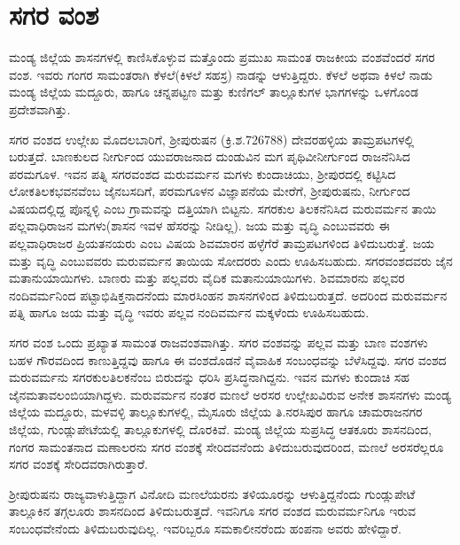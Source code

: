 \section{ಸಗರ ವಂಶ}

ಮಂಡ್ಯ ಜಿಲ್ಲೆಯ ಶಾಸನಗಳಲ್ಲಿ ಕಾಣಿಸಿಕೊಳ್ಳುವ ಮತ್ತೊಂದು ಪ್ರಮುಖ ಸಾಮಂತ ರಾಜಕೀಯ ವಂಶವೆಂದರೆ ಸಗರ ವಂಶ. ಇವರು ಗಂಗರ ಸಾಮಂತರಾಗಿ ಕೆಳಲೆ(ಕಿಳಲೆ ಸಹಸ್ರ) ನಾಡನ್ನು ಆಳುತ್ತಿದ್ದರು. ಕೆಳಲೆ ಅಥವಾ ಕಿಳಲೆ ನಾಡು ಮಂಡ್ಯ ಜಿಲ್ಲೆಯ ಮದ್ದೂರು, ಹಾಗೂ ಚನ್ನಪಟ್ಟಣ ಮತ್ತು ಕುಣಿಗಲ್​ ತಾಲ್ಲೂಕುಗಳ ಭಾಗಗಳನ್ನು ಒಳಗೊಂಡ ಪ್ರದೇಶವಾಗಿತ್ತು.

ಸಗರ ವಂಶದ ಉಲ್ಲೇಖ ಮೊದಲಬಾರಿಗೆ, ಶ‍್ರೀಪುರುಷನ (ಕ್ರಿ.ಶ.726\enginline{-}788) ದೇವರಹಳ್ಳಿಯ ತಾಮ್ರಪಟಗಳಲ್ಲಿ ಬರುತ್ತದೆ. ಬಾಣಕುಲದ ನೀರ್ಗುಂದ ಯುವರಾಜನಾದ ದುಂಡುವಿನ ಮಗ ಪೃಥಿವೀನೀರ್ಗುಂದ ರಾಜನೆನಿಸಿದ ಪರಮಗೂಳ. ಇವನ ಪತ್ನಿ ಸಗರವಂಶದ ಮರುವರ್ಮನ ಮಗಳು ಕುಂದಾಚಿಯು, ಶ‍್ರೀಪುರದಲ್ಲಿ ಕಟ್ಟಿಸಿದ ಲೋಕತಿಲಕಭವನವೆಂಬ ಜೈನಬಸದಿಗೆ, ಪರಮಗೂಳನ ವಿಜ್ಞಾಪನೆಯ ಮೇರೆಗೆ, ಶ‍್ರೀಪುರುಷನು, ನೀರ್ಗುಂದ ವಿಷಯದಲ್ಲಿದ್ದ ಪೊನ್ನಳ್ಳಿ ಎಂಬ ಗ್ರಾಮವನ್ನು ದತ್ತಿಯಾಗಿ ಬಿಟ್ಟನು. ಸಗರಕುಲ ತಿಲಕನೆನಿಸಿದ ಮರುವರ್ಮನ ತಾಯಿ ಪಲ್ಲವಾಧಿರಾಜನ ಮಗಳು(ಶಾಸನ ಇವಳ ಹೆಸರನ್ನು ನೀಡಿಲ್ಲ). ಜಯ ಮತ್ತು ವೃದ್ಧಿ ಎಂಬುವವರು ಈ ಪಲ್ಲವಾಧಿರಾಜರ ಪ್ರಿಯತನಯರು ಎಂಬ ವಿಷಯ ಶಿವಮಾರನ ಹಳ್ಳೆಗೆರೆ ತಾಮ್ರಪಟಗಳಿಂದ ತಿಳಿದುಬರುತ್ತೆ. ಜಯ ಮತ್ತು ವೃದ್ಧಿ ಎಂಬುವವರು ಮರುವರ್ಮನ ತಾಯಿಯ ಸೋದರರು ಎಂದು ಊಹಿಸಬಹುದು. ಸಗರವಂಶದವರು ಜೈನ ಮತಾನುಯಾಯಿಗಳು. ಬಾಣರು ಮತ್ತು ಪಲ್ಲವರು ವೈದಿಕ ಮತಾನುಯಾಯಿಗಳು. ಶಿವಮಾರನು ಪಲ್ಲವರ ನಂದಿವರ್ಮನಿಂದ ಪಟ್ಟಾಭಿಷಿಕ್ತನಾದನೆಂದು ಮಾರಸಿಂಹನ ಶಾಸನಗಳಿಂದ ತಿಳಿದುಬರುತ್ತದೆ. ಅದರಿಂದ ಮರುವರ್ಮನ ಪತ್ನಿ ಹಾಗೂ ಜಯ ಮತ್ತು ವೃದ್ಧಿ ಇವರು ಪಲ್ಲವ ನಂದಿವರ್ಮನ ಮಕ್ಕಳೆಂದು ಊಹಿಸಬಹುದು.

ಸಗರ ವಂಶ ಒಂದು ಪ್ರಖ್ಯಾತ ಸಾಮಂತ ರಾಜವಂಶವಾಗಿತ್ತು. ಸಗರ ವಂಶವನ್ನು ಪಲ್ಲವ ಮತ್ತು ಬಾಣ ವಂಶಗಳು ಬಹಳ ಗೌರವದಿಂದ ಕಾಣುತ್ತಿದ್ದವು ಹಾಗೂ ಈ ವಂಶದೊಡನೆ ವೈವಾಹಿಕ ಸಂಬಂಧವನ್ನು ಬೆಳೆಸಿದ್ದವು. ಸಗರ ವಂಶದ ಮರುವರ್ಮನು ಸಗರಕುಲತಿಲಕನೆಂಬ ಬಿರುದನ್ನು ಧರಿಸಿ ಪ್ರಸಿದ್ಧನಾಗಿದ್ದನು. ಇವನ ಮಗಳು ಕುಂದಾಚಿ ಸಹ ಜೈನಮತಾವಲಂಬಿಯಾಗಿದ್ದಳು. ಮರುವರ್ಮನ ನಂತರ ಮಣಲೆ ಅರಸರ ಉಲ್ಲೇಖವಿರುವ ಅನೇಕ ಶಾಸನಗಳು ಮಂಡ್ಯ ಜಿಲ್ಲೆಯ ಮದ್ದೂರು, ಮಳವಳ್ಳಿ ತಾಲ್ಲೂಕುಗಳಲ್ಲಿ, ಮೈಸೂರು ಜಿಲ್ಲೆಯ ತಿ.ನರಸಿಪುರ ಹಾಗೂ ಚಾಮರಾಜನಗರ ಜಿಲ್ಲೆಯ, ಗುಂಡ್ಲುಪೇಟೆಯಲ್ಲಿ ತಾಲ್ಲೂಕುಗಳಲ್ಲಿ ದೊರಕಿವೆ. ಮಂಡ್ಯ ಜಿಲ್ಲೆಯ ಸುಪ್ರಸಿದ್ಧ ಆತಕೂರು ಶಾಸನದಿಂದ, ಗಂಗರ ಸಾಮಂತನಾದ ಮಣಾಲರನು ಸಗರ ವಂಶಕ್ಕೆ ಸೇರಿದವನೆಂದು ತಿಳಿದುಬರುವುದರಿಂದ, ಮಣಲೆ ಅರಸರೆಲ್ಲರೂ ಸಗರ ವಂಶಕ್ಕೆ ಸೇರಿದವರಾಗಿರುತ್ತಾರೆ.

ಶ‍್ರೀಪುರುಷನು ರಾಜ್ಯವಾಳುತ್ತಿದ್ದಾಗ ವಿನೋದಿ ಮಣಲೆಯರನು ತಳಿಯೂರನ್ನು ಆಳುತ್ತಿದ್ದನೆಂದು ಗುಂಡ್ಲುಪೇಟೆ ತಾಲ್ಲೂಕಿನ ತಗ್ಗಲೂರು ಶಾಸನದಿಂದ ತಿಳಿದುಬರುತ್ತದೆ. ಇವನಿಗೂ ಸಗರ ವಂಶದ ಮರುವರ್ಮನಿಗೂ ಇರುವ ಸಂಬಂಧವೇನೆಂದು ತಿಳಿದುಬರುವುದಿಲ್ಲ. ಇವರಿಬ್ಬರೂ ಸಮಕಾಲೀನರೆಂದು ಹಂಪನಾ ಅವರು ಹೇಳಿದ್ದಾರೆ.

